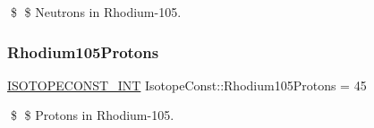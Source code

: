 \$ \$ Neutrons in Rhodium-\/105. \mbox{\label{group___isotope_const-_rhodium-_rh105_ga68484de76e7a803c91153d80df52e137}} 
\subsubsection{\texorpdfstring{Rhodium105\+Protons}{Rhodium105Protons}}
{\footnotesize\ttfamily \mbox{\hyperlink{group___isotope_const-_macros_ga5f18360b3e99483a35c32d789e62621c}{I\+S\+O\+T\+O\+P\+E\+C\+O\+N\+S\+T\+\_\+\+I\+NT}} Isotope\+Const\+::\+Rhodium105\+Protons = 45}

\$ \$ Protons in Rhodium-\/105. 